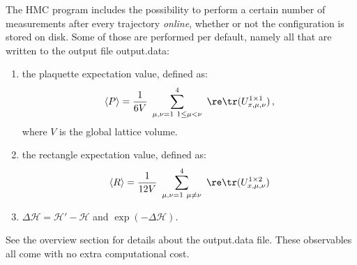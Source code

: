 The HMC program includes the possibility to perform a certain number
of measurements after every trajectory \emph{online}, whether or not
the configuration is stored on disk. Some of those are performed per
default, namely all that are written to the output file {\ttfamily
  output.data}: 
\begin{enumerate}
\item the plaquette expectation value, defined as:
  \[
  \langle P\rangle = \frac{1}{6 V}\ \sum_{\substack{
        \mu,\nu=1\ 1\leq\mu<\nu}}^4\ \re\tr(U^{1\times1}_{x,\mu,\nu})\, ,
  \]
  where $V$ is the global lattice volume.
\item the rectangle expectation value, defined as:
  \[
  \langle R\rangle = \frac{1}{12V}\ \sum_{\substack{\mu,\nu=1\
      \mu\neq\nu}}^4\ 
    \re\tr(U^{1\times2}_{x,\mu,\nu})
  \]
\item $\Delta\mathcal{H} = \mathcal{H}'-\mathcal{H}$ and $\exp(-\Delta\mathcal{H})$.
\end{enumerate}
See the overview section for details about the {\ttfamily output.data}
file. These observables all come with no extra computational cost.

